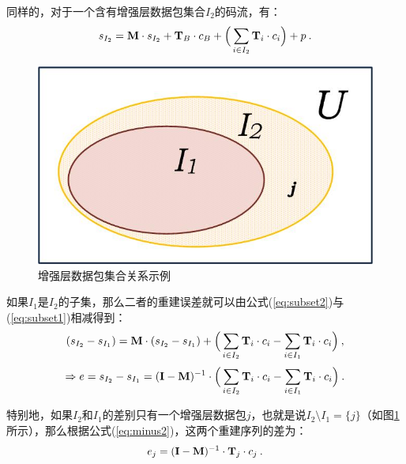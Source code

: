 同样的，对于一个含有增强层数据包集合$I_2$的码流，有：
\begin{equation}
\vspace{10pt}
\label{eq:subset2}
s_{I_2} = {\rm\bf M} \cdot s_{I_2} + {\rm\bf T}_{B} \cdot c_{B} + \Big( \sum_{i \in I_2}{\rm\bf T}_i \cdot c_i \Big) + p \: .
\end{equation}

\begin{figure}[t]
	\centering
	\vspace{10pt}
	\includegraphics[width = 0.8\linewidth]{figures/Subset.jpg}
	\vspace{10pt}
	\caption{增强层数据包集合关系示例 \label{fig:subset}}
\end{figure}

如果$I_1$是$I_2$的子集，那么二者的重建误差就可以由公式(\ref{eq:subset2})与(\ref{eq:subset1})相减得到：
\begin{equation}
\vspace{10pt}
\label{eq:minus1}
(s_{I_2} - s_{I_1}) = {\rm\bf M} \cdot (s_{I_2} - s_{I_1}) + \Big( \sum_{i \in I_2}{\rm\bf T}_i \cdot c_i - \sum_{i \in I_1}{\rm\bf T}_i \cdot c_i \Big) \: ,
\end{equation}
\begin{equation}
\vspace{10pt}
\label{eq:minus2}
\Rightarrow e = s_{I_2} - s_{I_1} = ({\rm\bf I - M})^{-1} \cdot \Big( \sum_{i \in I_2}{\rm\bf T}_i \cdot c_i - \sum_{i \in I_1}{\rm\bf T}_i \cdot c_i \Big) \: .
\end{equation}

特别地，如果$I_2$和$I_1$的差别只有一个增强层数据包$j$，也就是说$I_2 \setminus I_1 = \{j\}$（如图\ref{fig:subset}所示），那么根据公式(\ref{eq:minus2})，这两个重建序列的差为：
\begin{equation}
\vspace{10pt}
\label{eq:error_j}
e_j = ({\rm\bf I - M})^{-1} \cdot {\rm\bf T}_j \cdot c_j \: .
\end{equation}


